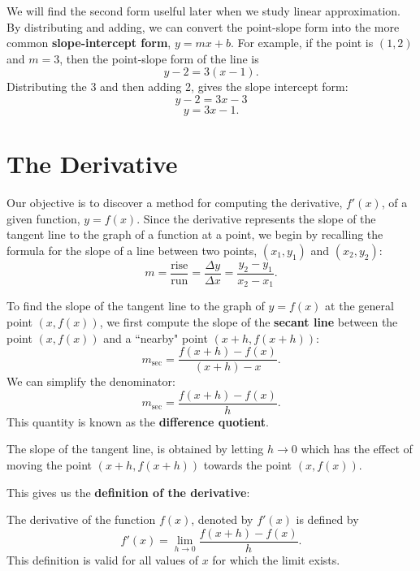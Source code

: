 \documentclass{ximera}
\begin{document}
We will find the second form uselful later when we study linear approximation.
By distributing and adding, we can convert the point-slope form into the more common \textbf{slope-intercept form}, $y = mx + b$.
For example, if the point is $(1,2)$ and $m = 3$, then the point-slope form of the line is 
\[
y - 2 = 3(x - 1).
\]
Distributing the 3 and then adding 2, gives the slope intercept form:
\[
y- 2 = 3x-3
\]
\[
y = 3x - 1.
\]



\section{The Derivative}
Our objective is to discover a method for computing the derivative, $f'(x)$, of a given function, $y = f(x)$.
Since the derivative represents the slope of the tangent line to the graph of a function at a point, 
we begin by recalling the formula for the slope of a line between two points, $(x_1, y_1)$ 
and $(x_2, y_2)$:
\[
m = \frac{\text{rise}}{\text{run}} = \frac{\Delta y}{\Delta x} = \frac{y_2 - y_1}{x_2 - x_1}.
\]

To find the slope of the tangent line to the graph of $y = f(x)$ at the general point $(x, f(x))$, we first 
compute the slope of the \textbf{secant line} between the point $(x, f(x))$ and a 
``nearby" point $(x+h, f(x+h))$:
\[m_{\text{sec}} = \frac{f(x+h) - f(x)}{(x+h)-x}.\]
We can simplify the denominator:
\[m_{\text{sec}} = \frac{f(x+h) - f(x)}{h}.\]
This quantity is known as the \textbf{difference quotient}.

The slope of the tangent line, is obtained by letting $h \to 0$ which has the effect of 
moving the point $(x+h, f(x+h))$ towards the point 
$(x, f(x))$.  


This gives us the \textbf{definition of the derivative}:

\begin{definition}[Derivative]
The derivative of the function $f(x)$, denoted by $f'(x)$ is defined by
\[f'(x) = \lim_{h \to 0} \frac{f(x+h)-f(x)}{h}.\]
This definition is valid for all values of $x$ for which the limit exists.
\end{definition}
\end{document}
